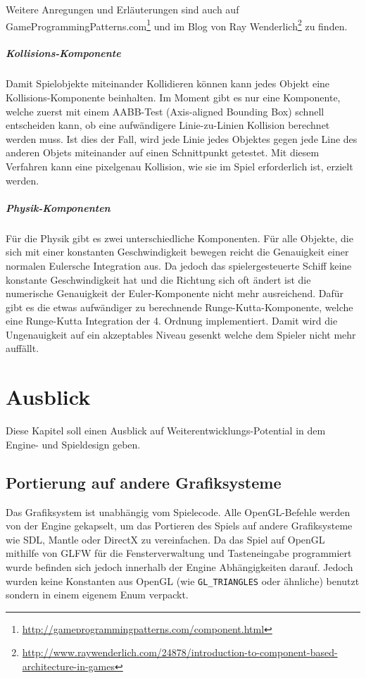 \documentclass[12pt, a4paper, titlepage, hidelinks]{scrreprt}
\begin{document}
Weitere Anregungen und Erläuterungen sind auch auf GameProgrammingPatterns.com\footnote{\url{http://gameprogrammingpatterns.com/component.html}} und im Blog von Ray Wenderlich\footnote{\url{http://www.raywenderlich.com/24878/introduction-to-component-based-architecture-in-games}} zu finden.

\paragraph{Kollisions-Komponente}
Damit Spielobjekte miteinander Kollidieren können kann jedes Objekt eine Kollisions-Komponente beinhalten. Im Moment gibt es nur eine Komponente, welche zuerst mit einem AABB-Test (Axis-aligned Bounding Box) schnell entscheiden kann, ob eine aufwändigere Linie-zu-Linien Kollision berechnet werden muss. Ist dies der Fall, wird jede Linie jedes Objektes gegen jede Line des anderen Objets miteinander auf einen Schnittpunkt getestet. Mit diesem Verfahren kann eine pixelgenau Kollision, wie sie im Spiel erforderlich ist, erzielt werden.

\paragraph{Physik-Komponenten}
Für die Physik gibt es zwei unterschiedliche Komponenten. Für alle Objekte, die sich mit einer konstanten Geschwindigkeit bewegen reicht die Genauigkeit einer normalen Eulersche Integration aus. Da jedoch das spielergesteuerte Schiff keine konstante Geschwindigkeit hat und die Richtung sich oft ändert ist die numerische Genauigkeit der Euler-Komponente nicht mehr ausreichend. Dafür gibt es die etwas aufwändiger zu berechnende Runge-Kutta-Komponente, welche eine Runge-Kutta Integration der 4. Ordnung implementiert. Damit wird die Ungenauigkeit auf ein akzeptables Niveau gesenkt welche dem Spieler nicht mehr auffällt.

\chapter{Ausblick}

Diese Kapitel soll einen Ausblick auf Weiterentwicklungs-Potential in dem Engine- und Spieldesign geben.

\section{Portierung auf andere Grafiksysteme}

Das Grafiksystem ist unabhängig vom Spielecode. Alle OpenGL-Befehle werden von der Engine gekapselt, um das Portieren des Spiels auf andere Grafiksysteme wie SDL, Mantle oder DirectX zu vereinfachen. Da das Spiel auf OpenGL mithilfe von GLFW für die Fensterverwaltung und Tasteneingabe programmiert wurde befinden sich jedoch innerhalb der Engine Abhängigkeiten darauf. Jedoch wurden keine Konstanten aus OpenGL (wie \texttt{GL\_TRIANGLES} oder ähnliche) benutzt sondern in einem eigenem Enum verpackt.
\end{document}
